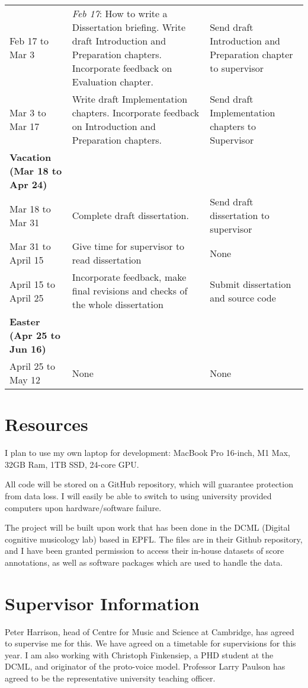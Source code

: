 \documentclass{article}
\begin{document}
{\begin{tabularx}{\textwidth}{@{} p{125pt} X p{110pt} @{}}
  Feb 17 to Mar 3 & \textit{Feb 17}: How to write a Dissertation briefing. Write draft Introduction and Preparation chapters. Incorporate feedback on Evaluation chapter. &Send draft Introduction and Preparation chapter to supervisor       \\
  Mar 3 to Mar 17 & Write draft Implementation chapters. Incorporate feedback on Introduction and Preparation chapters.& Send draft Implementation chapters to Supervisor       \\
  \midrule
  \bfseries{Vacation} (Mar 18 to Apr 24)  & &    \\ 
  Mar 18 to Mar 31 & Complete draft dissertation. & Send draft dissertation to supervisor       \\
  Mar 31 to April 15 & Give time for supervisor to read dissertation & None \\
  April 15 to April 25 & Incorporate feedback, make final revisions and checks of the whole dissertation & Submit dissertation and source code\\
  \midrule
  \bfseries{Easter} (Apr 25 to Jun 16)  &  &    \\ 
   April 25 to May 12 & None      & None             \\ 
  \bottomrule
\end{tabularx}}
\section{Resources}
I plan to use my own laptop for development: MacBook Pro 16-inch, M1 Max, 32GB Ram, 1TB SSD, 24-core GPU.

All code will be stored on a GitHub repository, which will guarantee protection from data loss. I will easily be able to switch to using university provided computers upon hardware/software failure.

The project will be built upon work that has been done in the DCML (Digital cognitive musicology lab) based in EPFL. The files are in their Github repository, and I have been granted permission to access their in-house datasets of score annotations, as well as software packages which are used to handle the data.
  
\section{Supervisor Information} 
Peter Harrison, head of Centre for Music and Science at Cambridge, has agreed to supervise me for this. 
We have agreed on a timetable for supervisions for this year. I am also working with Christoph Finkensiep, a PHD student at the DCML, and originator of the proto-voice model.
Professor Larry Paulson has agreed to be the representative university teaching officer.



\end{document}
